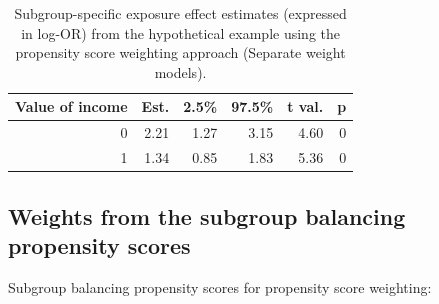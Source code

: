 \documentclass[
  letterpaper,
  DIV=11,
  numbers=noendperiod]{scrreprt}
\begin{document}
\hypertarget{tbl-sep-model2}{}
\begin{table}[!h]
\caption{\label{tbl-sep-model2}Subgroup-specific exposure effect estimates (expressed in log-OR) from
the hypothetical example using the propensity score weighting approach
(Separate weight models). }\tabularnewline

\centering
\begin{tabular}{rrrrrr}
\toprule
Value of income & Est. & 2.5\% & 97.5\% & t val. & p\\
\midrule
0 & 2.21 & 1.27 & 3.15 & 4.60 & 0\\
1 & 1.34 & 0.85 & 1.83 & 5.36 & 0\\
\bottomrule
\end{tabular}
\end{table}

\hypertarget{weights-from-the-subgroup-balancing-propensity-scores}{%
\subsection{Weights from the subgroup balancing propensity
scores}\label{weights-from-the-subgroup-balancing-propensity-scores}}

Subgroup balancing propensity scores for propensity score weighting:
\end{document}
